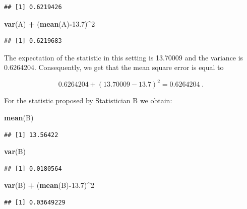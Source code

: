 \documentclass[
]{krantz}
\makeatletter
\newenvironment{Shaded}{\begin{snugshade}}{\end{snugshade}}
\newcommand{\DecValTok}[1]{\textcolor[rgb]{0.00,0.00,0.81}{#1}}
\newcommand{\FloatTok}[1]{\textcolor[rgb]{0.00,0.00,0.81}{#1}}
\newcommand{\KeywordTok}[1]{\textcolor[rgb]{0.13,0.29,0.53}{\textbf{#1}}}
\newcommand{\NormalTok}[1]{#1}
\newcommand{\OperatorTok}[1]{\textcolor[rgb]{0.81,0.36,0.00}{\textbf{#1}}}
\newcommand{\StringTok}[1]{\textcolor[rgb]{0.31,0.60,0.02}{#1}}
\newenvironment{kframe}{%
\medskip{}
\setlength{\fboxsep}{.8em}
 \def\at@end@of@kframe{}%
 \ifinner\ifhmode%
  \def\at@end@of@kframe{\end{minipage}}%
  \begin{minipage}{\columnwidth}%
 \fi\fi%
 \def\FrameCommand##1{\hskip\@totalleftmargin \hskip-\fboxsep
 \colorbox{shadecolor}{##1}\hskip-\fboxsep
     \hskip-\linewidth \hskip-\@totalleftmargin \hskip\columnwidth}%
 \MakeFramed {\advance\hsize-\width
   \@totalleftmargin\z@ \linewidth\hsize
   \@setminipage}}%
 {\par\unskip\endMakeFramed%
 \at@end@of@kframe}
\renewenvironment{Shaded}{\begin{kframe}}{\end{kframe}}
\theoremstyle{definition}
\theoremstyle{definition}
\theoremstyle{definition}
\theoremstyle{remark}
\makeatother
\begin{document}
\begin{verbatim}
## [1] 0.6219426
\end{verbatim}

\begin{Shaded}
\begin{Highlighting}[]
\KeywordTok{var}\NormalTok{(A) }\OperatorTok{+}\StringTok{ }\NormalTok{(}\KeywordTok{mean}\NormalTok{(A)}\OperatorTok{-}\FloatTok{13.7}\NormalTok{)}\OperatorTok{^}\DecValTok{2}
\end{Highlighting}
\end{Shaded}

\begin{verbatim}
## [1] 0.6219683
\end{verbatim}

The expectation of the statistic in this setting is 13.70009 and the
variance is 0.6264204. Consequently, we get that the mean square error
is equal to

\[0.6264204 + (13.70009 - 13.7)^2 = 0.6264204\;.\]

For the statistic proposed by Statistician B we obtain:

\begin{Shaded}
\begin{Highlighting}[]
\KeywordTok{mean}\NormalTok{(B)}
\end{Highlighting}
\end{Shaded}

\begin{verbatim}
## [1] 13.56422
\end{verbatim}

\begin{Shaded}
\begin{Highlighting}[]
\KeywordTok{var}\NormalTok{(B)}
\end{Highlighting}
\end{Shaded}

\begin{verbatim}
## [1] 0.0180564
\end{verbatim}

\begin{Shaded}
\begin{Highlighting}[]
\KeywordTok{var}\NormalTok{(B) }\OperatorTok{+}\StringTok{ }\NormalTok{(}\KeywordTok{mean}\NormalTok{(B)}\OperatorTok{-}\FloatTok{13.7}\NormalTok{)}\OperatorTok{^}\DecValTok{2}
\end{Highlighting}
\end{Shaded}

\begin{verbatim}
## [1] 0.03649229
\end{verbatim}
\end{document}
